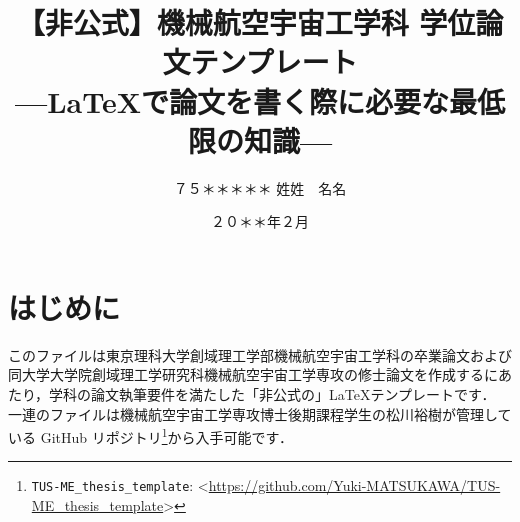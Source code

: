\documentclass[
    paper=a4paper,      %
    report,             %
    fleqn,              %
    fontsize=12pt,      %
    jafontsize=12pt,    %
    head_space=33mm,    %
    foot_space=30mm,    %
    gutter=25mm,        %
    fore-edge=10mm      %
    ]{jlreq}            %
\begin{document}


\title{【非公式】機械航空宇宙工学科 学位論文テンプレート\\ ---\LaTeX で論文を書く際に必要な最低限の知識---}

\date{２０＊＊年２月}




\author{%
７５＊＊＊＊＊
\zw%
姓姓　名名
} %

\makecover

\pagestyle{empty}
\def\thepage{}
\tableofcontents

\signary

\lipsum[1-10]


\clearpage
\pagestyle{normal}
\setcounter{page}{0}

\chapter{はじめに}
\label{ch:introduction}

このファイルは東京理科大学創域理工学部機械航空宇宙工学科の卒業論文および同大学大学院創域理工学研究科機械航空宇宙工学専攻の修士論文を作成するにあたり，学科の論文執筆要件を満たした「非公式の」\LaTeX テンプレートです．
一連のファイルは機械航空宇宙工学専攻博士後期課程学生の松川裕樹が管理している GitHub リポジトリ\footnote{\texttt{TUS-ME\_thesis\_template}: \textless\url{https://github.com/Yuki-MATSUKAWA/TUS-ME_thesis_template}\textgreater}から入手可能です．
\end{document}
